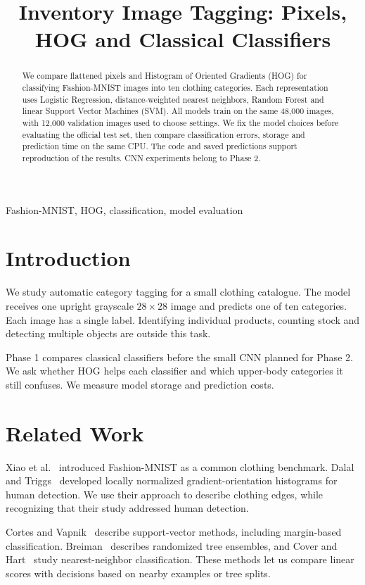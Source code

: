 \documentclass[conference]{IEEEtran}
\title{Inventory Image Tagging: Pixels, HOG and Classical Classifiers}
\author{\IEEEauthorblockN{Aryan, Divyanshu Singh, Jatin Kumar Singh, Jatin Verma, Kushagra Bhardwaj}
\IEEEauthorblockA{Enrolments: 2401020013, 2401010161, 2401010199, 2401010200, 2401010247\\
Contact: aryan.kinha2024@nst.rishihood.edu.in}}
\begin{document}
\maketitle
\begin{abstract}
We compare flattened pixels and Histogram of Oriented Gradients (HOG) for classifying Fashion-MNIST images into ten clothing categories. Each representation uses Logistic Regression, distance-weighted nearest neighbors, Random Forest and linear Support Vector Machines (SVM). All models train on the same 48,000 images, with 12,000 validation images used to choose settings. We fix the model choices before evaluating the official test set, then compare classification errors, storage and prediction time on the same CPU. The code and saved predictions support reproduction of the results. CNN experiments belong to Phase 2.
\end{abstract}
\begin{IEEEkeywords}Fashion-MNIST, HOG, classification, model evaluation\end{IEEEkeywords}

\section{Introduction}
We study automatic category tagging for a small clothing catalogue. The model receives one upright grayscale $28\times28$ image and predicts one of ten categories. Each image has a single label. Identifying individual products, counting stock and detecting multiple objects are outside this task.

Phase 1 compares classical classifiers before the small CNN planned for Phase 2. We ask whether HOG helps each classifier and which upper-body categories it still confuses. We measure model storage and prediction costs.

\section{Related Work}
Xiao et al.~\cite{fashion} introduced Fashion-MNIST as a common clothing benchmark. Dalal and Triggs~\cite{hog} developed locally normalized gradient-orientation histograms for human detection. We use their approach to describe clothing edges, while recognizing that their study addressed human detection.

Cortes and Vapnik~\cite{svm} describe support-vector methods, including margin-based classification. Breiman~\cite{rf} describes randomized tree ensembles, and Cover and Hart~\cite{knn} study nearest-neighbor classification. These methods let us compare linear scores with decisions based on nearby examples or tree splits.
\end{document}
